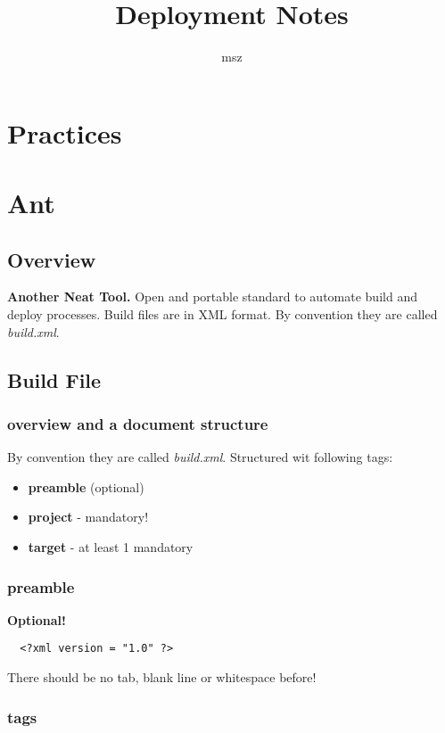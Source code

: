 \documentclass{report}
\title{Deployment Notes}
\author{msz}
\begin{document}
\tableofcontents




\part{Practices}




\part{Ant}



\chapter{Overview}
\textbf{Another Neat Tool.} Open and portable standard to automate 
build and deploy processes. Build files are in XML format. By convention 
they are called \textit{build.xml}.



\chapter{Build File}


\section{overview and a document structure}
By convention they are called \textit{build.xml}. Structured wit following
tags:
\begin{itemize}
  \item \textbf{preamble} (optional)
  \item \textbf{project} - mandatory!
  \item \textbf{target} - at least 1 mandatory
\end{itemize}


\section{preamble}
\textbf{Optional!}

  \begin{verbatim}
  <?xml version = "1.0" ?>
  \end{verbatim}
  
  There should be no tab, blank line or whitespace before!


\section{tags}
\end{document}
